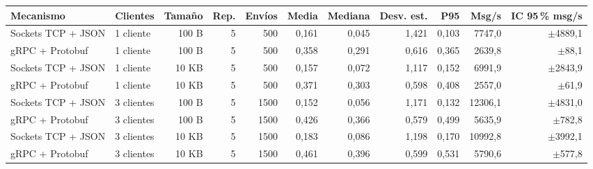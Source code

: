 \begin{tabular}{llrrrrrrrrr}
\toprule
Mecanismo & Clientes & Tamaño & Rep. & Envíos & Media & Mediana & Desv. est. & P95 & Msg/s & IC 95\,\% msg/s \\
\midrule
Sockets TCP + JSON & 1 cliente & 100 B & 5 & 500 & 0,161 & 0,045 & 1,421 & 0,103 & 7747,0 & $\pm$4889,1 \\
gRPC + Protobuf & 1 cliente & 100 B & 5 & 500 & 0,358 & 0,291 & 0,616 & 0,365 & 2639,8 & $\pm$88,1 \\
Sockets TCP + JSON & 1 cliente & 10 KB & 5 & 500 & 0,157 & 0,072 & 1,117 & 0,152 & 6991,9 & $\pm$2843,9 \\
gRPC + Protobuf & 1 cliente & 10 KB & 5 & 500 & 0,371 & 0,303 & 0,598 & 0,408 & 2557,0 & $\pm$61,9 \\
Sockets TCP + JSON & 3 clientes & 100 B & 5 & 1500 & 0,152 & 0,056 & 1,171 & 0,132 & 12306,1 & $\pm$4831,0 \\
gRPC + Protobuf & 3 clientes & 100 B & 5 & 1500 & 0,426 & 0,366 & 0,579 & 0,499 & 5635,9 & $\pm$782,8 \\
Sockets TCP + JSON & 3 clientes & 10 KB & 5 & 1500 & 0,183 & 0,086 & 1,198 & 0,170 & 10992,8 & $\pm$3992,1 \\
gRPC + Protobuf & 3 clientes & 10 KB & 5 & 1500 & 0,461 & 0,396 & 0,599 & 0,531 & 5790,6 & $\pm$577,8 \\
\bottomrule
\end{tabular}
